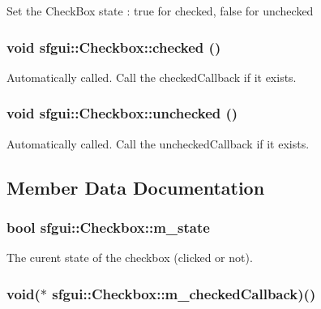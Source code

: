 Set the CheckBox state : true for checked, false for unchecked \hypertarget{classsfgui_1_1Checkbox_79ad5f7de619782ce22c3657e82ce077}{
\subsubsection[checked]{\setlength{\rightskip}{0pt plus 5cm}void sfgui::Checkbox::checked ()}}
\label{classsfgui_1_1Checkbox_79ad5f7de619782ce22c3657e82ce077}




Automatically called. Call the checkedCallback if it exists. \hypertarget{classsfgui_1_1Checkbox_f593cc2c1b79231410a2b2f5d70ef034}{
\subsubsection[unchecked]{\setlength{\rightskip}{0pt plus 5cm}void sfgui::Checkbox::unchecked ()}}
\label{classsfgui_1_1Checkbox_f593cc2c1b79231410a2b2f5d70ef034}




Automatically called. Call the uncheckedCallback if it exists. 

\subsection{Member Data Documentation}
\hypertarget{classsfgui_1_1Checkbox_ce642ae51c0d2aee08ba05be73c5bf06}{
\subsubsection[m\_\-state]{\setlength{\rightskip}{0pt plus 5cm}bool {\bf sfgui::Checkbox::m\_\-state}}}
\label{classsfgui_1_1Checkbox_ce642ae51c0d2aee08ba05be73c5bf06}


The curent state of the checkbox (clicked or not). 

\hypertarget{classsfgui_1_1Checkbox_a597f2897aa340d538d399d0bdcaf26c}{
\subsubsection[m\_\-checkedCallback]{\setlength{\rightskip}{0pt plus 5cm}void($\ast$ {\bf sfgui::Checkbox::m\_\-checkedCallback})()}}
\label{classsfgui_1_1Checkbox_a597f2897aa340d538d399d0bdcaf26c}


